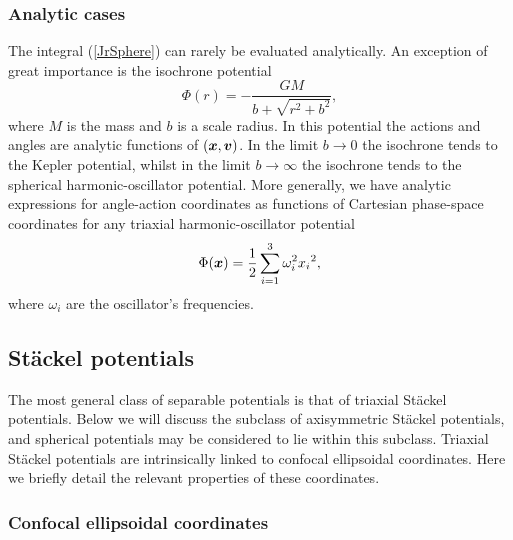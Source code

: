 \documentclass[useAMS,usenatbib,fleqn,a4paper]{mn2e}
\newcommand{\bs}[1]{\bmath{#1}}
\begin{document}
\subsubsection{Analytic cases}\label{Sect::analytic}

The integral (\ref{JrSphere}) can rarely be evaluated analytically.
An exception of great importance  is the isochrone
potential \citep{Henon}
\begin{equation}
\Phi(r) = -\frac{GM}{b+\sqrt{r^2+b^2}},
\end{equation}
 where $M$ is the mass and $b$ is a scale radius. In this potential the
actions and angles are analytic functions of $(\bs{x},\bs{v})$. In the limit
$b\rightarrow0$ the isochrone tends to the Kepler potential, whilst in the
limit $b\rightarrow\infty$ the isochrone tends to the spherical
harmonic-oscillator potential.  More generally, we have analytic expressions
for angle-action coordinates as functions of Cartesian phase-space coordinates
for any triaxial harmonic-oscillator potential
\begin{equation}
\Phi(\bs{x}) = \frac{1}{2}\sum_{i=1}^3\omega_i^2{x_i}^2,
\end{equation}
where $\omega_i$ are the oscillator's frequencies.


\subsection{St\"ackel potentials}\label{StackelPot}

The most general class of separable potentials is that of triaxial St\"ackel
potentials. Below we will discuss the subclass of axisymmetric St\"ackel
potentials, and spherical potentials may be considered to lie within this
subclass. Triaxial St\"ackel potentials are intrinsically linked to confocal
ellipsoidal coordinates. Here we briefly detail the relevant properties of
these coordinates.

\subsubsection{Confocal ellipsoidal coordinates}
\end{document}
